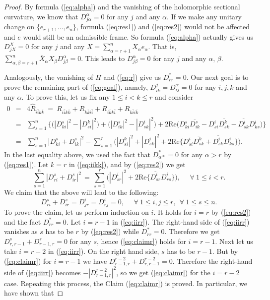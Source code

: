 \documentclass{amsart}
\begin{document}
\begin{proof}
By formula (\ref{eq:alpha}) and the vanishing of the holomorphic sectional curvature, we know that $D^{\alpha}_{j\alpha}=0$ for any $j$ and any $\alpha$. If we make any unitary change on $\{ e_{r\!+\!1},\ldots , e_n\}$, formula (\ref{eq:res1}) and (\ref{eq:res2}) would not be affected and $e$ would still be an admissible frame. So formula (\ref{eq:alpha}) actually gives us $D^{X}_{jX}=0$ for any $j$ and any $X=\sum_{\alpha =r\!+\!1}^n X_{\alpha}e_{\alpha}$. That is, $\sum_{\alpha ,\beta=r\!+\!1}^n \overline{X}_{\alpha} X_{\beta} D^{\alpha}_{j\beta }=0$. This leads to $D^{\alpha}_{j\beta}=0$ for any $j$ and any $\alpha$, $\beta$. 

Analogously, the vanishing of $H$ and (\ref{eq:r}) give us $D^{\ast}_{rr}=0$. Our next goal is to prove the remaining part of (\ref{eq:goal}), namely, 
$D^j_{ik}=D^{\alpha}_{ij}=0$ for any $ i$,\,$j$,\,$k$ and any $ \alpha$. To prove this, let us fix any $1\leq i<k\leq r$ and consider
\begin{eqnarray}
0 & = & 4\widehat{R}_{i\bar{i}k\bar{k}} \ = \ R_{i\bar{i}k\bar{k}} + R_{k\bar{k}i\bar{i}}  + R_{i\bar{k}k\bar{i}} +R_{k\bar{i}i\bar{k}} \nonumber \\
& = & \sum_{s=1}^n \{ \big( |D^s_{ki}|^2 -  |D^k_{si}|^2\big) + \big(|D^s_{ik}|^2 -  |D^i_{sk}|^2\big)  +2\mbox{Re}  \big( D^s_{ki}\overline{D^s_{ik}} - D^i_{si}\overline{D^k_{sk}} - \overline{D^i_{sk}} D^i_{ks} \big) \} \nonumber \\
& = & \sum_{s=1}^n |D^s_{ki}+D^s_{ik}|^2 -  \sum_{s=1}^r \big( |D^k_{si}|^2 + |D^i_{sk}|^2 + 2\mbox{Re} \{ D^i_{si}\overline{D^k_{sk}} + \overline{D^i_{sk}} D^i_{ks} \} \big). \label{eq:iikk}
\end{eqnarray}
In the last equality above, we used the fact that $D^{\ast}_{\alpha \ast}=0$ for any $\alpha >r$ by (\ref{eq:res1}). Let $k=r$ in (\ref{eq:iikk}), and by (\ref{eq:res2}) we get
\begin{equation}  \label{eq:iirr}
 \sum_{s=1}^n |D^s_{ri}+D^s_{ir}|^2 \, = \, \sum_{s=1}^r \big(  |D^i_{sr}|^2 + 2\mbox{Re} \{  \overline{D^i_{sr}} D^i_{rs} \} \big) , \ \ \ \ \ \ \forall \ 1\leq i<r.
 \end{equation}
We claim that the above will lead to the following:
\begin{equation}  \label{eq:claimr}
 D^s_{ri}+D^s_{ir}=D^i_{jr}=D^i_{rj}=0, \ \ \ \ \ \ \forall \ 1\leq i,j\leq r, \ \ \forall \ 1\leq s\leq n.
 \end{equation}
To prove the claim, let us perform induction on $i$. It holds for $i=r$ by (\ref{eq:res2}) and the fact $D^{\ast}_{rr}=0$. Let $i=r\!-\!1$ in (\ref{eq:iirr}). The right-hand side of (\ref{eq:iirr}) vanishes as $s$ has to be $r$ by (\ref{eq:res2}) while $D^{\ast}_{rr}=0$. Therefore we get $D^s_{r,r\!-\!1}+D^s_{r\!-\!1,r} =0$ for any $s$, hence (\ref{eq:claimr}) holds for $i=r\!-\!1$. Next let us take $i=r\!-\!2$ in (\ref{eq:iirr}). On the right hand side, $s$ has to be $r\!-\!1$. But by (\ref{eq:claimr}) for $i=r\!-\!1$ we have $D^{r\!-\!2}_{r\!-\!1,r} + D^{r\!-\!2}_{r,r\!-\!1}=0$. Therefore the right-hand side of (\ref{eq:iirr}) becomes $-| D^{r\!-\!2}_{r\!-\!1,r} |^2$, so we get (\ref{eq:claimr}) for the $i=r\!-\!2$ case. Repeating this process, the Claim (\ref{eq:claimr}) is proved. In particular, we have shown that

\end{proof}
\end{document}

